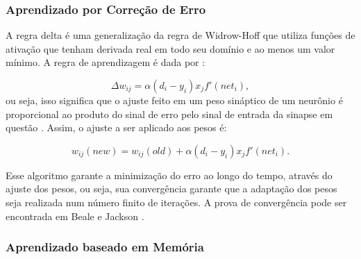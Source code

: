 \subsubsection{Aprendizado por Correção de Erro}

A regra delta é uma generalização da regra de Widrow-Hoff \cite{widrow1960adaptive} que utiliza funções de ativação que tenham derivada real em todo seu domínio e ao menos um valor mínimo. A regra de aprendizagem é dada por \label{symbol:regraAprendizErro}:

\begin{equation}
\label{eq:deltarule}
\Delta w_{ij} = \alpha(d_i - y_i)x_jf'(net_i) ,
\end{equation}
ou seja, isso significa que o ajuste feito em um peso sináptico de um neurônio é proporcional ao produto do sinal de erro pelo sinal de entrada da sinapse em questão \cite{haykin-1994}. Assim, o ajuste a ser aplicado aos pesos é:

\begin{equation}
\label{eq:peso_novo}
w_{ij}(new) = w_{ij}(old) + \alpha(d_i - y_i)x_jf'(net_i) .
\end{equation}

Esse algoritmo garante a minimização do erro ao longo do tempo, através do ajuste dos pesos, ou seja, sua convergência garante que a adaptação dos pesos seja realizada num número finito de iterações. A prova de convergência pode ser encontrada em Beale e Jackson \cite{beale2010neural}.

\subsubsection{Aprendizado baseado em Memória}

